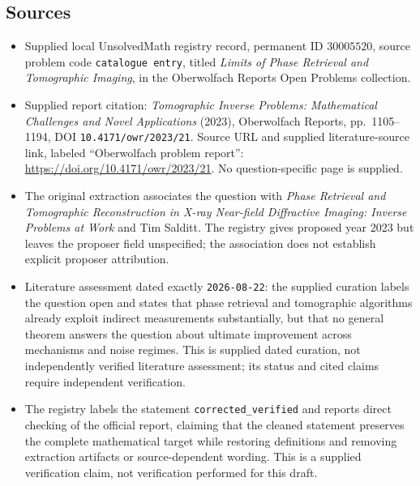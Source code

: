 \documentclass[11pt]{article}
\begin{document}
\subsection{Sources}
\begin{itemize}
\item Supplied local UnsolvedMath registry record, permanent ID \(30005520\), source problem code \texttt{catalogue entry}, titled \emph{Limits of Phase Retrieval and Tomographic Imaging}, in the Oberwolfach Reports Open Problems collection.
\item Supplied report citation: \emph{Tomographic Inverse Problems: Mathematical Challenges and Novel Applications} (2023), Oberwolfach Reports, pp.\ 1105--1194, DOI \texttt{10.4171/owr/2023/21}. Source URL and supplied literature-source link, labeled ``Oberwolfach problem report'': \url{https://doi.org/10.4171/owr/2023/21}. No question-specific page is supplied.
\item The original extraction associates the question with \emph{Phase Retrieval and Tomographic Reconstruction in X-ray Near-field Diffractive Imaging: Inverse Problems at Work} and Tim Salditt. The registry gives proposed year 2023 but leaves the proposer field unspecified; the association does not establish explicit proposer attribution.
\item Literature assessment dated exactly \texttt{2026-08-22}: the supplied curation labels the question open and states that phase retrieval and tomographic algorithms already exploit indirect measurements substantially, but that no general theorem answers the question about ultimate improvement across mechanisms and noise regimes. This is supplied dated curation, not independently verified literature assessment; its status and cited claims require independent verification.
\item The registry labels the statement \texttt{corrected\_verified} and reports direct checking of the official report, claiming that the cleaned statement preserves the complete mathematical target while restoring definitions and removing extraction artifacts or source-dependent wording. This is a supplied verification claim, not verification performed for this draft.
\end{itemize}
\end{document}
